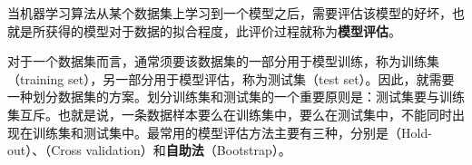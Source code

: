 
\begin{issues}
\issueDraft
\end{issues}


当机器学习算法从某个数据集上学习到一个模型之后，需要评估该模型的好坏，也就是所获得的模型对于数据的拟合程度，此评价过程就称为\textbf{模型评估}。

对于一个数据集而言，通常须要该数据集的一部分用于模型训练，称为训练集（training set），另一部分用于模型评估，称为测试集（test set）。因此，就需要一种划分数据集的方案。划分训练集和测试集的一个重要原则是：测试集要与训练集互斥。也就是说，一条数据样本要么在训练集中，要么在测试集中，不能同时出现在训练集和测试集中。最常用的模型评估方法主要有三种，分别是（Hold-out）、（Cross validation）和\textbf{自助法}（Bootstrap）。
